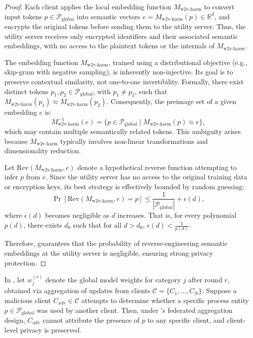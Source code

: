 \begin{proof}
Each client applies the local embedding function \(M_{\text{w2v-harm}}\) to convert input tokens \(p \in \mathcal{P}_{\text{global}}\) into semantic vectors \(e = M_{\text{w2v-harm}}(p) \in \mathbb{R}^d\), and encrypts the original tokens before sending them to the utility server. Thus, the utility server receives only encrypted identifiers and their associated semantic embeddings, with no access to the plaintext tokens or the internals of \(M_{\text{w2v-harm}}\).

The embedding function \(M_{\text{w2v-harm}}\), trained using a distributional objective (e.g., skip-gram with negative sampling), is inherently non-injective. Its goal is to preserve contextual similarity, not one-to-one invertibility. Formally, there exist distinct tokens \(p_1, p_2 \in \mathcal{P}_{\text{global}}\), with \(p_1 \neq p_2\), such that \(M_{\text{w2v-harm}}(p_1) \approx M_{\text{w2v-harm}}(p_2)\). Consequently, the preimage set of a given embedding \(e\) is:
\[
M_{\text{w2v-harm}}^{-1}(e) = \{p \in \mathcal{P}_{\text{global}} \mid M_{\text{w2v-harm}}(p) \approx e\},
\]
which may contain multiple semantically related tokens. This ambiguity arises because \(M_{\text{w2v-harm}}\) typically involves non-linear transformations and dimensionality reduction.

Let \(\text{Rev}(M_{\text{w2v-harm}}, e)\) denote a hypothetical reverse function attempting to infer \(p\) from \(e\). Since the utility server has no access to the original training data or encryption keys, its best strategy is effectively bounded by random guessing:
\[
\Pr[\text{Rev}(M_{\text{w2v-harm}}, e) = p] \leq \frac{1}{|\mathcal{P}_{\text{global}}|} + \epsilon(d),
\]
where \(\epsilon(d)\) becomes negligible as \(d\) increases. That is, for every polynomial \(p(d)\), there exists \(d_0\) such that for all \(d > d_0\), \(\epsilon(d) < \frac{1}{p(d)}\).

Therefore, \Sys guarantees that the probability of reverse-engineering semantic embeddings at the utility server is negligible, ensuring strong privacy protection.

\end{proof}

  
\begin{theorem}
  In \Sys, let \(w_j^{(r)}\) denote the global model weights for category \(j\) after round \(r\), obtained via aggregation of updates from clients \(\mathcal{C} = \{C_1, \ldots, C_N\}\). Suppose a malicious client \(C_{\text{adv}} \in \mathcal{C}\) attempts to determine whether a specific process entity \(p \in \mathcal{P}_{\text{global}}\) was used by another client. Then, under \Sys’s federated aggregation design, \(C_{\text{adv}}\) cannot attribute the presence of \(p\) to any specific client, and client-level privacy is preserved.
  \end{theorem}
  
